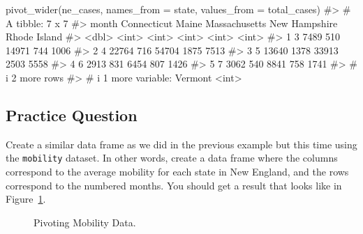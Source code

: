 \documentclass[
  letterpaper,
]{latex/krantz}
\makeatletter
\newenvironment{Shaded}{\begin{snugshade}}{\end{snugshade}}
\newcommand{\AttributeTok}[1]{\textcolor[rgb]{0.40,0.45,0.13}{#1}}
\newcommand{\CommentTok}[1]{\textcolor[rgb]{0.37,0.37,0.37}{#1}}
\newcommand{\FunctionTok}[1]{\textcolor[rgb]{0.28,0.35,0.67}{#1}}
\newcommand{\NormalTok}[1]{\textcolor[rgb]{0.00,0.23,0.31}{#1}}
\newenvironment{kframe}{%
\medskip{}
\setlength{\fboxsep}{.8em}
 \def\at@end@of@kframe{}%
 \ifinner\ifhmode%
  \def\at@end@of@kframe{\end{minipage}}%
  \begin{minipage}{\columnwidth}%
 \fi\fi%
 \def\FrameCommand##1{\hskip\@totalleftmargin \hskip-\fboxsep
 \colorbox{shadecolor}{##1}\hskip-\fboxsep
     \hskip-\linewidth \hskip-\@totalleftmargin \hskip\columnwidth}%
 \MakeFramed {\advance\hsize-\width
   \@totalleftmargin\z@ \linewidth\hsize
   \@setminipage}}%
 {\par\unskip\endMakeFramed%
 \at@end@of@kframe}
\renewenvironment{Shaded}{\begin{kframe}}{\end{kframe}}
\makeatother
\begin{document}
\begin{Shaded}
\begin{Highlighting}[]
\FunctionTok{pivot\_wider}\NormalTok{(ne\_cases, }\AttributeTok{names\_from =}\NormalTok{ state, }\AttributeTok{values\_from =}\NormalTok{ total\_cases)}
\CommentTok{\#\textgreater{} \# A tibble: 7 x 7}
\CommentTok{\#\textgreater{}   month Connecticut Maine Massachusetts \textasciigrave{}New Hampshire\textasciigrave{} \textasciigrave{}Rhode Island\textasciigrave{}}
\CommentTok{\#\textgreater{}   \textless{}dbl\textgreater{}       \textless{}int\textgreater{} \textless{}int\textgreater{}         \textless{}int\textgreater{}           \textless{}int\textgreater{}          \textless{}int\textgreater{}}
\CommentTok{\#\textgreater{} 1     3        7489   510         14971             744           1006}
\CommentTok{\#\textgreater{} 2     4       22764   716         54704            1875           7513}
\CommentTok{\#\textgreater{} 3     5       13640  1378         33913            2503           5558}
\CommentTok{\#\textgreater{} 4     6        2913   831          6454             807           1426}
\CommentTok{\#\textgreater{} 5     7        3062   540          8841             758           1741}
\CommentTok{\#\textgreater{} \# i 2 more rows}
\CommentTok{\#\textgreater{} \# i 1 more variable: Vermont \textless{}int\textgreater{}}
\end{Highlighting}
\end{Shaded}

\subsection{Practice Question}\label{practice-question-11}

Create a similar data frame as we did in the previous example but this
time using the \texttt{mobility} dataset. In other words, create a data
frame where the columns correspond to the average mobility for each
state in New England, and the rows correspond to the numbered months.
You should get a result that looks like in
Figure~\ref{fig-mobility-pivot}.

\begin{figure}


\caption{\label{fig-mobility-pivot}Pivoting Mobility Data.}

\end{figure}%
\end{document}
